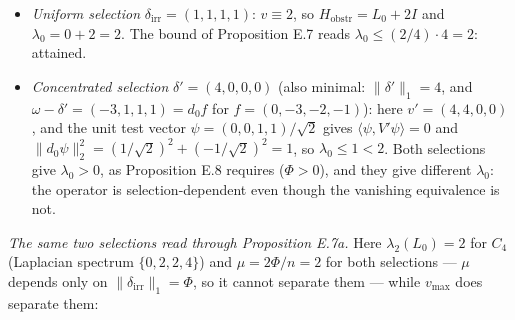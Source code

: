 \documentclass[
]{article}
\providecommand{\tightlist}{%
  \setlength{\itemsep}{0pt}\setlength{\parskip}{0pt}}
\providecommand{\tightlist}{%
  \setlength{\itemsep}{0pt}\setlength{\parskip}{0pt}}
\begin{document}
\begin{itemize}
\tightlist
\item
  \emph{Uniform selection} \(\delta_{\mathrm{irr}} = (1,1,1,1)\): \(v \equiv 2\), so \(H_{\mathrm{obstr}} = L_0 + 2I\) and \(\lambda_0 = 0 + 2 = 2\). The bound of Proposition E.7 reads \(\lambda_0 \le (2/4)\cdot 4 = 2\): attained.
\item
  \emph{Concentrated selection} \(\delta' = (4,0,0,0)\) (also minimal: \(\|\delta'\|_1 = 4\), and \(\omega - \delta' = (-3,1,1,1) = d_0 f\) for \(f = (0,-3,-2,-1)\)): here \(v' = (4,4,0,0)\), and the unit test vector \(\psi = (0,0,1,1)/\sqrt{2}\) gives \(\langle \psi, V'\psi \rangle = 0\) and \(\|d_0\psi\|_2^2 = (1/\sqrt2)^2 + (-1/\sqrt2)^2 = 1\), so \(\lambda_0 \le 1 < 2\).
  Both selections give \(\lambda_0 > 0\), as Proposition E.8 requires (\(\Phi > 0\)), and they give different \(\lambda_0\): the operator is selection-dependent even though the vanishing equivalence is not.
\end{itemize}

\emph{The same two selections read through Proposition E.7a.} Here \(\lambda_2(L_0) = 2\) for \(C_4\) (Laplacian spectrum \(\{0,2,2,4\}\)) and \(\mu = 2\Phi/n = 2\) for both selections --- \(\mu\) depends only on \(\|\delta_{\mathrm{irr}}\|_1 = \Phi\), so it cannot separate them --- while \(v_{\max}\) does separate them:
\end{document}
